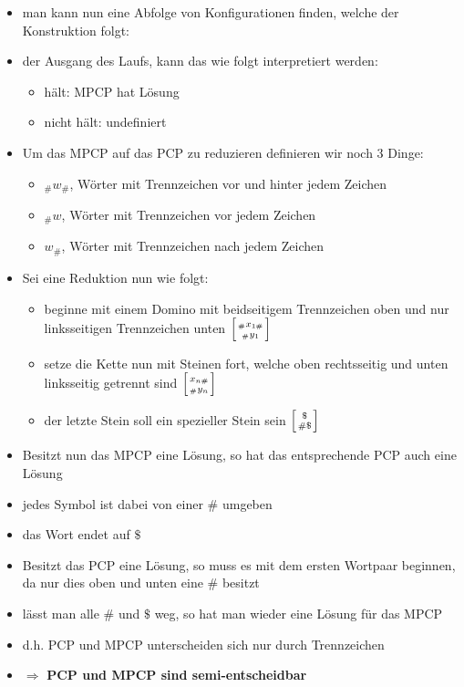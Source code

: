 \documentclass[12pt,a4paper]{article}
\begin{document}
\begin{itemize}
\item man kann nun eine Abfolge von Konfigurationen finden, welche der Konstruktion folgt:
\item der Ausgang des Laufs, kann das wie folgt interpretiert werden:\\
\begin{itemize}
\item hält: MPCP hat Lösung
\item nicht hält: undefiniert
\end{itemize}
\item Um das MPCP auf das PCP zu reduzieren definieren wir noch 3 Dinge:
\begin{itemize}
\item $_\#w_\#$, Wörter mit Trennzeichen vor und hinter jedem Zeichen
\item $_\#w$, Wörter mit Trennzeichen vor jedem Zeichen
\item $w_\#$, Wörter mit Trennzeichen nach jedem Zeichen
\end{itemize}
\item Sei eine Reduktion nun wie folgt:
\begin{itemize}
\item beginne mit einem Domino mit beidseitigem Trennzeichen oben und nur linksseitigen Trennzeichen unten
$ \left[ { _\#x_{1\#} \atop _\#y_1 } \right]$
\item setze die Kette nun mit Steinen fort, welche oben rechtsseitig und unten linksseitig getrennt sind
$ \left[ { x_{n\#} \atop _\#y_n } \right]$
\item der letzte Stein soll ein spezieller Stein sein
$ \left[ { \$ \atop \# \$ } \right]$
\end{itemize}
\item Besitzt nun das MPCP eine Lösung, so hat das entsprechende PCP auch eine Lösung
\item jedes Symbol ist dabei von einer $\#$ umgeben
\item das Wort endet auf $\$ $
\item Besitzt das PCP eine Lösung, so muss es mit dem ersten Wortpaar beginnen, da nur dies oben und unten eine $ \# $ besitzt
\item lässt man alle $ \# $ und  $ \$ $ weg, so hat man wieder eine Lösung für das MPCP
\item d.h. PCP und MPCP unterscheiden sich nur durch Trennzeichen
\item $\Rightarrow$ \textbf{PCP und MPCP sind semi-entscheidbar}
\end{itemize}
\end{document}
